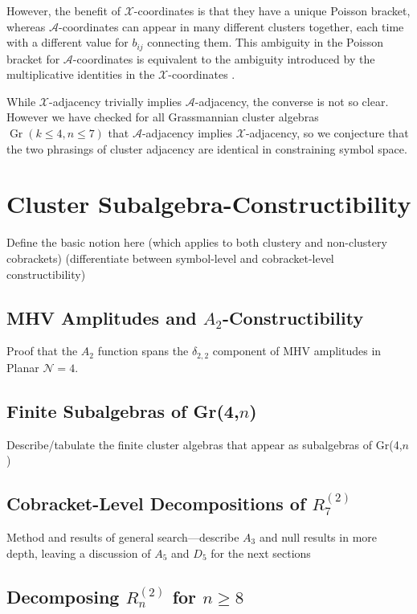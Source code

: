 \documentclass[11pt]{article}
\DeclareMathOperator{\Gr}{Gr}
\def\x{\mathcal{X}}
\def\xcoords{$\mathcal{X}$-coordinates }
\def\a{\mathcal{A}}
\def\acoords{$\mathcal{A}$-coordinates }
\def\flag{{\huge \color{red} \textinterrobang}}
\def\pdfeq#1{\texorpdfstring{$#1$}{a}}
\begin{document}
However, the benefit of \xcoords is that they have a unique Poisson bracket, whereas \acoords can appear in many different clusters together, each time with a different value for $b_{ij}$ connecting them. This ambiguity in the Poisson bracket for \acoords is equivalent to the ambiguity introduced by the multiplicative identities in the \xcoords.  

While $\x$-adjacency trivially implies $\a$-adjacency, the converse is not so clear. However we have checked for all Grassmannian cluster algebras $\Gr(k\le4,n\le7)$ that $\a$-adjacency implies $\x$-adjacency, so we conjecture that the two phrasings of cluster adjacency are identical in constraining symbol space. \flag




\section{Cluster Subalgebra-Constructibility} 

Define the basic notion here (which applies to both clustery and non-clustery cobrackets) (differentiate between symbol-level and cobracket-level constructibility)

\subsection{MHV Amplitudes and \pdfeq{A_2}-Constructibility}

Proof that the \pdfeq{A_2} function spans the $\delta_{2,2}$ component of MHV amplitudes in Planar $\mathcal{N}=4$.

\subsection{Finite Subalgebras of Gr(4,$n$)}

Describe/tabulate the finite cluster algebras that appear as subalgebras of Gr(4,$n$)

\subsection{Cobracket-Level Decompositions of \pdfeq{R_7^{(2)}}}

Method and results of general search---describe \pdfeq{A_3} and null results in more depth, leaving a discussion of \pdfeq{A_5} and \pdfeq{D_5} for the next sections

\subsection{Decomposing \pdfeq{R_n^{(2)}} for $n \ge 8$}
\end{document}
